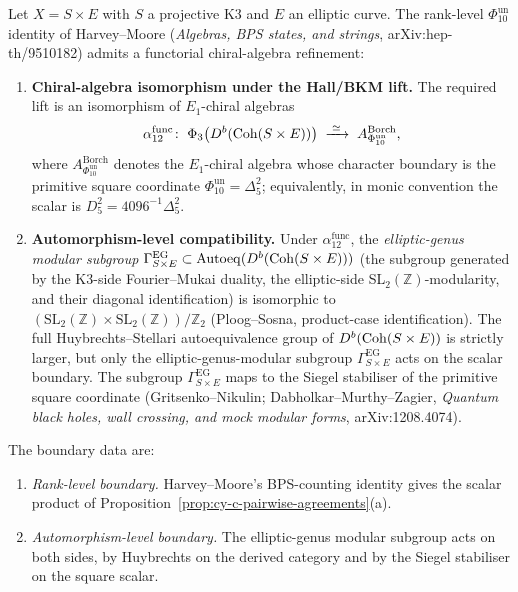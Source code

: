 \begin{theorem}
\label{conj:harvey-moore-functorial}
Let $X = S \times E$ with $S$ a projective K3 and $E$ an elliptic curve. The rank-level \(\Phi_{10}^{\mathrm{un}}\) identity of Harvey--Moore (\emph{Algebras, BPS states, and strings}, arXiv:hep-th/9510182) admits a functorial chiral-algebra refinement:
\begin{enumerate}[label=\textup{(\alph*)}]
 \item \textbf{Chiral-algebra isomorphism under the Hall/BKM lift.} The required lift is an isomorphism of $E_1$-chiral algebras
 \[
 \alpha_{12}^{\mathrm{func}}\colon\; \Phi_3\bigl(D^b(\mathrm{Coh}(S \times E))\bigr) \;\xrightarrow{\;\simeq\;}\; A^{\mathrm{Borch}}_{\Phi_{10}^{\mathrm{un}}},
 \]
 where \(A^{\mathrm{Borch}}_{\Phi_{10}^{\mathrm{un}}}\) denotes the \(E_1\)-chiral algebra whose character boundary is the primitive square coordinate \(\Phi_{10}^{\mathrm{un}}=\Delta_5^2\); equivalently, in monic convention the scalar is \(D_5^2=4096^{-1}\Delta_5^2\).
 \item \textbf{Automorphism-level compatibility.} Under $\alpha_{12}^{\mathrm{func}}$, the \emph{elliptic-genus modular subgroup} $\Gamma^{\mathrm{EG}}_{S \times E} \subset \mathrm{Autoeq}(D^b(\mathrm{Coh}(S \times E)))$ (the subgroup generated by the K3-side Fourier--Mukai duality, the elliptic-side SL$_2(\mathbb{Z})$-modularity, and their diagonal identification) is isomorphic to $(\mathrm{SL}_2(\mathbb{Z}) \times \mathrm{SL}_2(\mathbb{Z})) / \mathbb{Z}_2$ (Ploog--Sosna, product-case identification). The full Huybrechts--Stellari autoequivalence group of $D^b(\mathrm{Coh}(S \times E))$ is strictly larger, but only the elliptic-genus-modular subgroup $\Gamma^{\mathrm{EG}}_{S \times E}$ acts on the scalar boundary. The subgroup $\Gamma^{\mathrm{EG}}_{S \times E}$ maps to the Siegel stabiliser of the primitive square coordinate (Gritsenko--Nikulin; Dabholkar--Murthy--Zagier, \emph{Quantum black holes, wall crossing, and mock modular forms}, arXiv:1208.4074).
\end{enumerate}
The boundary data are:
\begin{enumerate}[label=\textup{(E\arabic*)}]
 \item \emph{Rank-level boundary.} Harvey--Moore's BPS-counting identity gives the scalar product of Proposition~\ref{prop:cy-c-pairwise-agreements}(a).
 \item \emph{Automorphism-level boundary.} The elliptic-genus modular subgroup acts on both sides, by Huybrechts on the derived category and by the Siegel stabiliser on the square scalar.

\end{enumerate}
\end{theorem}
